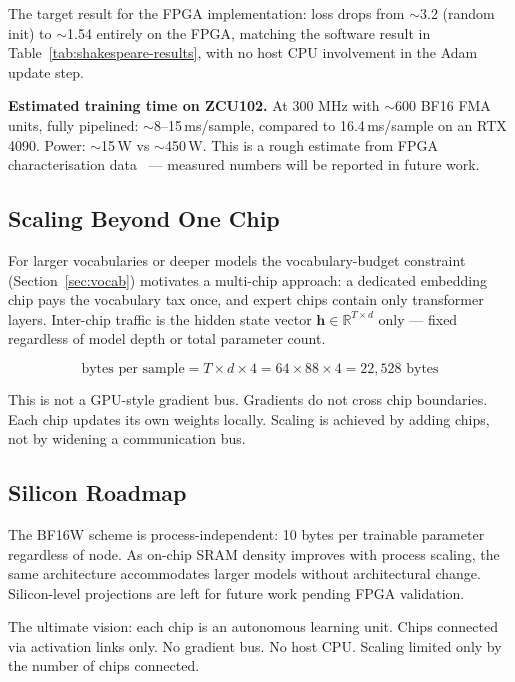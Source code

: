 \documentclass[11pt]{article}
\begin{document}
The target result for the FPGA implementation: loss drops from $\sim$3.2 (random init) to $\sim$1.54
entirely on the FPGA, matching the software result in Table~\ref{tab:shakespeare-results},
with no host CPU involvement in the Adam update step.

\textbf{Estimated training time on ZCU102.} At 300 MHz with $\sim$600 BF16 FMA units,
fully pipelined: $\sim$8--15\,ms/sample, compared to 16.4\,ms/sample on an RTX 4090.
Power: $\sim$15\,W vs $\sim$450\,W. This is a rough estimate from FPGA characterisation
data~\cite{xilinx_power} --- measured numbers will be reported in future work.

\subsection{Scaling Beyond One Chip}

For larger vocabularies or deeper models the vocabulary-budget constraint
(Section~\ref{sec:vocab}) motivates a multi-chip approach: a dedicated embedding chip
pays the vocabulary tax once, and expert chips contain only transformer layers.
Inter-chip traffic is the hidden state vector $\mathbf{h} \in \mathbb{R}^{T \times d}$
only --- fixed regardless of model depth or total parameter count.

\begin{equation}
\text{bytes per sample} = T \times d \times 4 = 64 \times 88 \times 4 = 22{,}528 \text{ bytes}
\end{equation}

This is not a GPU-style gradient bus. Gradients do not cross chip boundaries.
Each chip updates its own weights locally. Scaling is achieved by adding chips,
not by widening a communication bus.

\subsection{Silicon Roadmap}

The BF16W scheme is process-independent: 10 bytes per trainable parameter regardless of node.
As on-chip SRAM density improves with process scaling, the same architecture accommodates
larger models without architectural change. Silicon-level projections are left for future work
pending FPGA validation.

The ultimate vision: each chip is an autonomous learning unit. Chips connected via activation
links only. No gradient bus. No host CPU. Scaling limited only by the number of chips connected.
\end{document}
